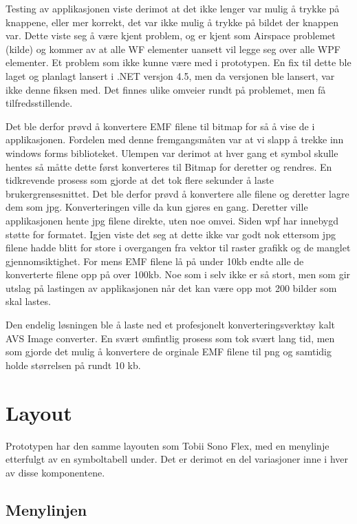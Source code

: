 { 
Testing av applikasjonen viste derimot at det ikke lenger var mulig å trykke på knappene, eller mer korrekt, det var ikke mulig å trykke på  bildet der knappen var. Dette viste seg å være kjent problem, og er kjent som Airspace problemet (kilde) og kommer av at alle WF elementer uansett vil legge seg over alle WPF elementer. Et problem som ikke kunne være med i prototypen. En fix til dette ble laget og planlagt lansert i .NET versjon 4.5, men da versjonen ble lansert, var ikke denne fiksen med. Det finnes ulike omveier rundt på problemet, men få tilfredsstillende.  
 
 
Det ble derfor prøvd å konvertere EMF filene til bitmap for så å vise de i applikasjonen. Fordelen med denne fremgangsmåten var at vi slapp å trekke inn windows forms biblioteket. Ulempen var derimot at hver gang et symbol skulle hentes så måtte dette først konverteres til Bitmap for deretter og rendres. En tidkrevende prosess som gjorde at det tok flere sekunder å laste brukergrensesnittet. Det ble derfor prøvd å konvertere alle filene og deretter lagre dem som jpg. Konverteringen ville da kun gjøres en gang. Deretter ville applikasjonen hente jpg filene direkte, uten noe omvei. Siden wpf har innebygd støtte for formatet. Igjen viste det seg at dette ikke var godt nok ettersom jpg filene hadde blitt for store i overgangen fra vektor til raster grafikk og de manglet gjennomsiktighet. For mens EMF filene lå på under 10kb endte alle de konverterte filene opp på over 100kb. Noe som i selv ikke er så stort, men som gir utslag på lastingen av applikasjonen når det kan være opp mot 200 bilder som skal lastes. 
 
 
Den endelig løsningen ble å laste ned et profesjonelt konverteringsverktøy kalt AVS Image converter. En svært ømfintlig prosess som tok svært lang tid, men som gjorde det mulig å konvertere de orginale EMF filene til png og samtidig holde størrelsen på rundt 10 kb. 
 
 
 
 
 

 
 
\section{Layout} 
 
 
Prototypen har den samme layouten som Tobii Sono Flex, med en menylinje etterfulgt av en symboltabell under. Det er derimot en del variasjoner inne i hver av disse komponentene. 
 
 
\subsection{Menylinjen} 
 
}
